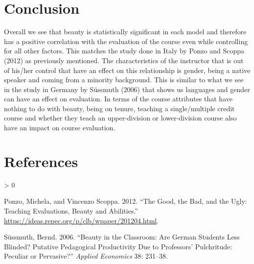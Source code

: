 \documentclass[
  12 pt,
]{article}
\newlength{\cslhangindent}
\newenvironment{CSLReferences}[2] %
 {%
  \setlength{\parindent}{0pt}
  \ifodd #1 \everypar{\setlength{\hangindent}{\cslhangindent}}\ignorespaces\fi
  \ifnum #2 > 0
  \setlength{\parskip}{#2\baselineskip}
  \fi
 }%
 {}
\begin{document}
\hypertarget{conclusion}{%
\section{Conclusion}\label{conclusion}}

Overall we see that beauty is statistically significant in each model and therefore has a positive correlation with the evaluation of the course even while controlling for all other factors. This matches the study done in Italy by Ponzo and Scoppa (2012) as previously mentioned. The characteristics of the instructor that is out of his/her control that have an effect on this relationship is gender, being a native speaker and coming from a minority background. This is similar to what we see in the study in Germany by Süssmuth (2006) that shows us languages and gender can have an effect on evaluation. In terms of the course attributes that have nothing to do with beauty, being on tenure, teaching a single/multiple credit course and whether they teach an upper-division or lower-division course also have an impact on course evaluation.

\hypertarget{references}{%
\section*{References}\label{references}}

\hypertarget{refs}{}
\begin{CSLReferences}{1}{0}
\leavevmode\hypertarget{ref-Ref1}{}%
Ponzo, Michela, and Vincenzo Scoppa. 2012. {``The Good, the Bad, and the Ugly: Teaching Evaluations, Beauty and Abilities.''} \url{https://ideas.repec.org/p/clb/wpaper/201204.html}.

\leavevmode\hypertarget{ref-Ref2}{}%
Süssmuth, Bernd. 2006. {``Beauty in the Classroom: Are German Students Less Blinded? Putative Pedagogical Productivity Due to Professors' Pulchritude: Peculiar or Pervasive?''} \emph{Applied Economics} 38: 231--38.

\end{CSLReferences}
\end{document}
